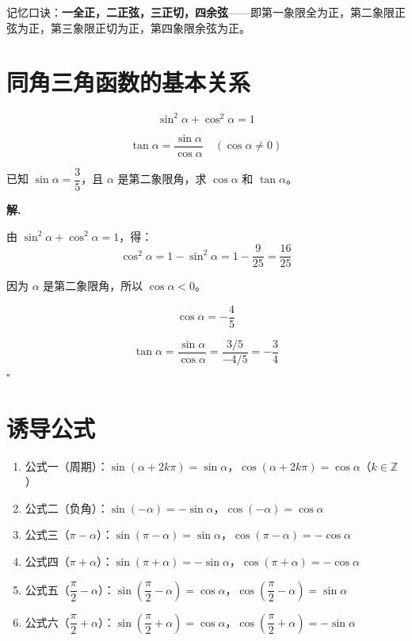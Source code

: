 \begin{note}
记忆口诀：\textbf{一全正，二正弦，三正切，四余弦}——即第一象限全为正，第二象限正弦为正，第三象限正切为正，第四象限余弦为正。
\end{note}

\section{同角三角函数的基本关系}

\begin{theorem}[平方关系]
\[ \sin^2\alpha + \cos^2\alpha = 1 \]
\end{theorem}

\begin{theorem}[商数关系]
\[ \tan\alpha = \frac{\sin\alpha}{\cos\alpha} \quad (\cos\alpha \neq 0) \]
\end{theorem}

\begin{example}
已知 $\sin\alpha = \dfrac{3}{5}$，且 $\alpha$ 是第二象限角，求 $\cos\alpha$ 和 $\tan\alpha$。
\end{example}

\textbf{解.}

由 $\sin^2\alpha + \cos^2\alpha = 1$，得：
\[ \cos^2\alpha = 1 - \sin^2\alpha = 1 - \frac{9}{25} = \frac{16}{25} \]

因为 $\alpha$ 是第二象限角，所以 $\cos\alpha < 0$。

\[ \cos\alpha = -\frac{4}{5} \]

\[ \tan\alpha = \frac{\sin\alpha}{\cos\alpha} = \frac{3/5}{-4/5} = -\frac{3}{4} \]
\hfill $\square$

\section{诱导公式}

\begin{theorem}[诱导公式]
\begin{enumerate}
    \item 公式一（周期）：$\sin(\alpha + 2k\pi) = \sin\alpha$，$\cos(\alpha + 2k\pi) = \cos\alpha$（$k \in \mathbb{Z}$）
    \item 公式二（负角）：$\sin(-\alpha) = -\sin\alpha$，$\cos(-\alpha) = \cos\alpha$
    \item 公式三（$\pi - \alpha$）：$\sin(\pi - \alpha) = \sin\alpha$，$\cos(\pi - \alpha) = -\cos\alpha$
    \item 公式四（$\pi + \alpha$）：$\sin(\pi + \alpha) = -\sin\alpha$，$\cos(\pi + \alpha) = -\cos\alpha$
    \item 公式五（$\dfrac{\pi}{2} - \alpha$）：$\sin\left(\dfrac{\pi}{2} - \alpha\right) = \cos\alpha$，$\cos\left(\dfrac{\pi}{2} - \alpha\right) = \sin\alpha$
    \item 公式六（$\dfrac{\pi}{2} + \alpha$）：$\sin\left(\dfrac{\pi}{2} + \alpha\right) = \cos\alpha$，$\cos\left(\dfrac{\pi}{2} + \alpha\right) = -\sin\alpha$
\end{enumerate}
\end{theorem}

